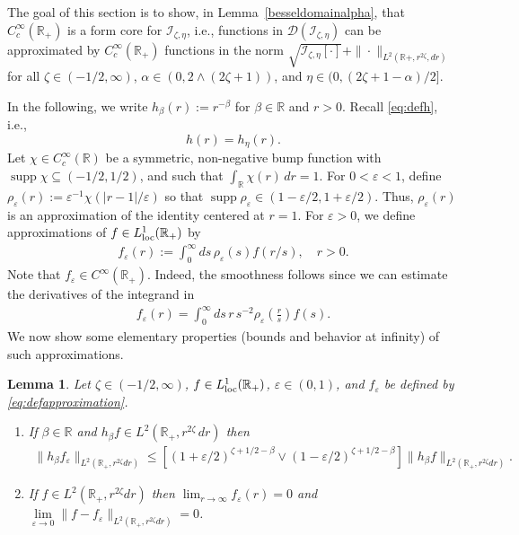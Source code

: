 \documentclass[12pt,reqno]{amsart}
\newtheorem{lemma}[theorem]{Lemma}
\theoremstyle{definition}
\theoremstyle{remark}
\numberwithin{equation}{section}
\newcommand{\1}{\mathbbm{1}}
\newcommand{\D}{\mathcal{D}}
\renewcommand{\epsilon}{\varepsilon}
\newcommand{\loc}{{\rm loc}}
\newcommand{\R}{\mathbb{R}}
\DeclareMathOperator{\supp}{supp}
\def\ci{\mathcal{I}}
\begin{document}
\smallskip
The goal of this section is to show, in Lemma~\ref{besseldomainalpha}, that $C_c^\infty(\R_+)$ is a form core for $\ci_{\zeta,\eta}$, i.e., functions in $\D(\ci_{\zeta,\eta})$ can be approximated by $C_c^\infty(\R_+)$ functions in the norm $\sqrt{\ci_{\zeta,\eta}[\cdot]} + \|\cdot\|_{L^2(\R+, r^{2\zeta} , dr)}$ for all $\zeta \in (-1/2, \infty)$, $\alpha \in (0, 2\wedge(2\zeta + 1))$, and $\eta \in (0, (2\zeta + 1 - \alpha)/2]$.

In the following, we write $h_\beta(r):=r^{-\beta}$ for $\beta\in\R$ and $r>0$. Recall \eqref{eq:defh}, i.e., 
$$
h(r) = h_\eta(r).
$$
Let $\chi\in C_c^\infty(\R)$ be a symmetric, non-negative bump function with $\supp\chi\subseteq(-1/2,1/2)$, and such that $\int_\R\chi(r)\,dr=1$. For $0<\epsilon<1$, define $\rho_\epsilon(r):=\epsilon^{-1}\chi(|r-1|/\epsilon)$ so that $\supp \rho_\epsilon\in(1-\epsilon/2,1+\epsilon/2)$. Thus, $\rho_\epsilon(r)$ is an approximation of the identity centered at $r=1$.
For $\epsilon>0$, we define approximations of $f\in L_\loc^1(\R_+)$ by
\begin{align}
  \label{eq:defapproximation}
  f_\epsilon(r) := \int_0^\infty ds\, \rho_\epsilon(s)f(r/s), \quad r>0.
\end{align}
Note that $f_\epsilon\in C^\infty(\R_+)$. Indeed, 
the smoothness follows since we can estimate the derivatives of the integrand in
\begin{align}
  f_\epsilon(r) = \int_0^\infty ds\, r\, s^{-2} \rho_\epsilon\left(\frac rs\right) f(s).
\end{align}
We now show some elementary properties (bounds and behavior at infinity) of such approximations.
\begin{lemma}
  \label{approximation}
  Let $\zeta\in(-1/2,\infty)$, $f\in L_\loc^1(\R_+)$, $\epsilon\in(0,1)$, and $f_\epsilon$ be defined by \eqref{eq:defapproximation}.
  \begin{enumerate}
  \item If $\beta\in\R$ and $h_\beta f\in L^2(\R_+,r^{2\zeta}\,dr)$ then
  \begin{align}
    \label{e.ba}
    \|h_\beta f_\epsilon\|_{L^2(\R_+,r^{2\zeta}dr)}
    \leq \left[(1+\epsilon/2)^{\zeta+1/2-\beta}\vee(1-\epsilon/2)^{\zeta+1/2-\beta}\right] \|h_\beta f\|_{L^2(\R_+,r^{2\zeta}dr)}.
  \end{align}
  
  \item If $f\in L^2(\R_+,r^{2\zeta}dr)$ then $\lim_{r\to \infty}f_\epsilon(r)=0$ and $\lim\limits_{\epsilon\to0} \|f-f_\epsilon\|_{L^2(\R_+,r^{2\zeta}dr)} = 0$.
  \end{enumerate}
\end{lemma}
\end{document}
